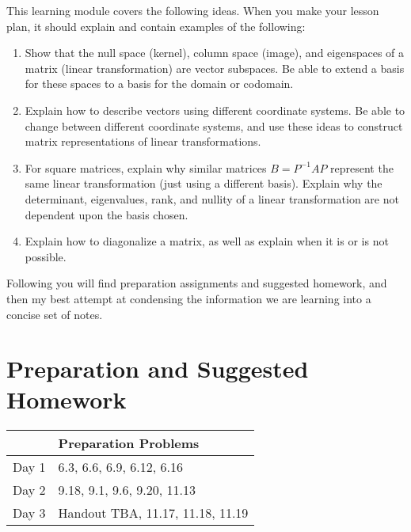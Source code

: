 \documentclass[10pt]{article}
\theoremstyle{plain}
\theoremstyle{box}
\newcommand{\mytitle}{Similar Matrices}
\begin{document}
\noindent{\huge{\bf \mytitle}}

\noindent
This learning module covers the following ideas.  When you make your lesson plan, it should explain and contain examples of the following:
\begin{enumerate}

\item Show that the null space (kernel), column space (image), and eigenspaces of a matrix (linear transformation) are vector subspaces. Be able to extend a basis for these spaces to a basis for the domain or codomain.
\item Explain how to describe vectors using different coordinate systems. Be able to change between different coordinate systems, and use these ideas to construct matrix representations of linear transformations.
\item For square matrices, explain why similar matrices $B=P^{-1}AP$ represent the same linear transformation (just using a different basis). Explain why the determinant, eigenvalues, rank, and nullity of a linear transformation are not dependent upon the basis chosen.
\item Explain how to diagonalize a matrix, as well as explain when it is or is not possible. 

\end{enumerate}


Following you will find preparation assignments and suggested homework, and then my best attempt at condensing the information we are learning into a concise set of notes. 

\section{Preparation and Suggested Homework}

\begin{center}
\begin{tabular}{ll}
&Preparation Problems\\
\hline\hline
Day 1& 6.3, 6.6, 6.9, 6.12, 6.16\\\hline
Day 2& 9.18, 9.1, 9.6, 9.20, 11.13 \\\hline
Day 3& Handout TBA, 11.17, 11.18, 11.19\\\hline
\end{tabular}
\end{center}
\end{document}
